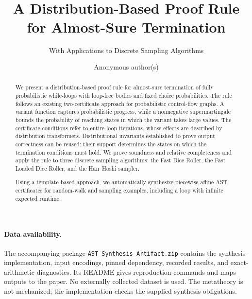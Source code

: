 \documentclass[runningheads]{llncs}
\newif\ifappendixversion
\begin{document}
\title{A Distribution-Based Proof Rule\\
for Almost-Sure Termination}
\subtitle{With Applications to Discrete Sampling Algorithms}

\author{Anonymous author(s)}
\institute{}

\maketitle

\begin{abstract}
We present a distribution-based proof rule for almost-sure termination
of fully probabilistic while-loops with loop-free bodies and fixed
choice probabilities. The rule follows an existing two-certificate
approach for probabilistic control-flow graphs. A variant function
captures probabilistic progress, while a nonnegative supermartingale
bounds the probability of reaching states in which the variant takes
large values. The certificate conditions refer to entire loop
iterations, whose effects are described by distribution transformers.
Distributional invariants established to prove output correctness
can be reused: their support determines the states on which the
termination conditions must hold. We prove soundness and relative
completeness and apply the rule to three discrete sampling algorithms:
the Fast Dice Roller, the Fast Loaded Dice Roller, and the Han--Hoshi
sampler.

Using a template-based approach, we automatically synthesize
piecewise-affine AST certificates for random-walk and sampling
examples, including a loop with infinite expected runtime.

\end{abstract}






\FloatBarrier




\paragraph{Data availability.}
The accompanying package \texttt{AST\_Synthesis\_Artifact.zip} contains the
synthesis implementation, input encodings, pinned dependency, recorded
results, and exact-arithmetic diagnostics. Its README gives reproduction
commands and maps outputs to the paper. No externally collected dataset
is used. The metatheory is not mechanized; the implementation checks the
supplied synthesis obligations.




\ifappendixversion
\clearpage
\appendix




\fi
\end{document}
